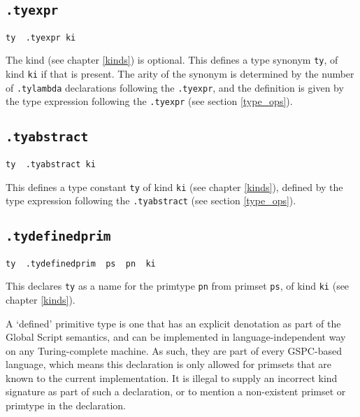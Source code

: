 \documentclass{report}
\newcommand\stringcode[1]{\texttt{#1}}
\begin{document}
\subsection{\stringcode{.tyexpr}}

\begin{verbatim}
ty	.tyexpr	ki
\end{verbatim}

The kind (see chapter \ref{kinds}) is optional.
This defines a type synonym \stringcode{ty}, of kind \stringcode{ki} if that is present.
The arity of the synonym is determined by the number of \stringcode{.tylambda} declarations following the \stringcode{.tyexpr},
and the definition is given by the type expression following the \stringcode{.tyexpr} (see section \ref{type_ops}).

\subsection{\stringcode{.tyabstract}}

\begin{verbatim}
ty	.tyabstract	ki
\end{verbatim}

This defines a type constant \stringcode{ty} of kind \stringcode{ki} (see chapter \ref{kinds}),
defined by the type expression following the \stringcode{.tyabstract} (see section \ref{type_ops}).

\subsection{\stringcode{.tydefinedprim}}

\begin{verbatim}
ty	.tydefinedprim	ps	pn	ki
\end{verbatim}

This declares \stringcode{ty} as a name for the primtype \stringcode{pn} from primset \stringcode{ps}, of kind \stringcode{ki} (see chapter \ref{kinds}).

A `defined' primitive type is one that has an explicit denotation as part of the Global Script semantics,
and can be implemented in  language-independent way on any Turing-complete machine.
As such, they are part of every GSPC-based language,
which means this declaration is only allowed for primsets that are known to the current implementation.
It is illegal to supply an incorrect kind signature as part of such a declaration,
or to mention a non-existent primset or primtype in the declaration.
\end{document}
